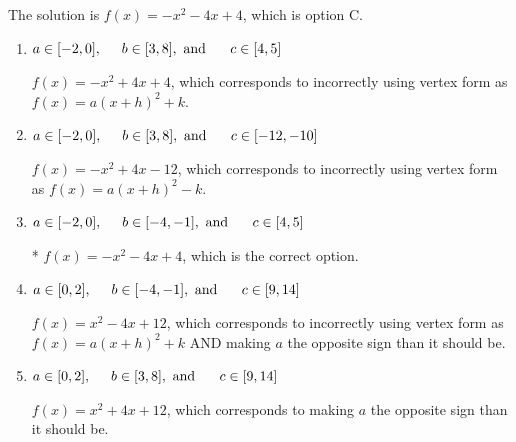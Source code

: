 \documentclass{extbook}[14pt]
\begin{document}
\begin{enumerate}
{The solution is \( f(x) = -x^{2} -4 x + 4 \), which is option C.\begin{enumerate}[label=\Alph*.]
\item \( a \in [-2, 0], \hspace*{5mm} b \in [3, 8], \text{ and } \hspace*{5mm} c \in [4, 5] \)

$f(x)=-x^{2} +4 x + 4$, which corresponds to incorrectly using vertex form as $f(x) = a(x+h)^2+k$.
\item \( a \in [-2, 0], \hspace*{5mm} b \in [3, 8], \text{ and } \hspace*{5mm} c \in [-12, -10] \)

$f(x)=-x^{2} +4 x -12$, which corresponds to incorrectly using vertex form as $f(x) = a(x+h)^2 - k$.
\item \( a \in [-2, 0], \hspace*{5mm} b \in [-4, -1], \text{ and } \hspace*{5mm} c \in [4, 5] \)

* $f(x)=-x^{2} -4 x + 4$, which is the correct option.
\item \( a \in [0, 2], \hspace*{5mm} b \in [-4, -1], \text{ and } \hspace*{5mm} c \in [9, 14] \)

$f(x)=x^{2} -4 x + 12$, which corresponds to incorrectly using vertex form as $f(x) = a(x+h)^2+k$ AND making $a$ the opposite sign than it should be.
\item \( a \in [0, 2], \hspace*{5mm} b \in [3, 8], \text{ and } \hspace*{5mm} c \in [9, 14] \)

$f(x)=x^{2} +4 x + 12$, which corresponds to making $a$ the opposite sign than it should be.
\end{enumerate}

}
\end{enumerate}
\end{document}
